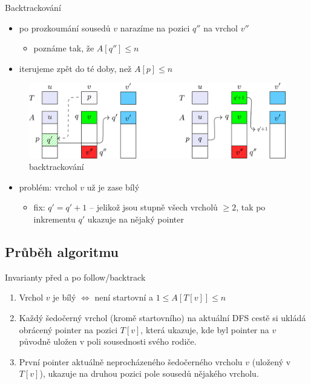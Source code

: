 \documentclass[czech]{beamer}
\begin{document}
	\begin{frame}{Backtrackování}
		\begin{itemize}
			\item po prozkoumání sousedů $v$ narazíme na pozici $q''$ na vrchol $v''$
			\begin{itemize}
				\item poznáme tak, že $A[q''] \le n$
			\end{itemize}
			\item iterujeme zpět do té doby, než $A[p] \le n$
		\end{itemize}

		\begin{figure}
			\centering
			\includegraphics{images/deg2-fix.png}
			\caption{backtrackování}
		\end{figure}
		\begin{itemize}
			\item problém: vrchol $v$ už je zase bílý
			\begin{itemize}
				\item fix: $q' = q' + 1$ -- jelikož jsou stupně všech vrcholů $\ge 2$, tak po inkrementu $q'$ ukazuje na nějaký pointer
			\end{itemize}
		\end{itemize}
	\end{frame}
		
	\subsection{Průběh algoritmu}

	\begin{frame}{Invarianty před a po follow/backtrack}
		\begin{enumerate}
				\item Vrchol $v$ je bílý $\iff$ není startovní a $1 \le A[T[v]] \le n$
				\item Každý šedočerný vrchol (kromě startovního) na aktuální DFS cestě si ukládá obrácený pointer na pozici $T[v]$, která ukazuje, kde byl pointer na $v$ původně uložen v poli sousednosti svého rodiče.
				\item První pointer aktuálně neprocházeného šedočerného vrcholu $v$ (uložený v $T[v]$), ukazuje na druhou pozici pole sousedů nějakého vrcholu.
		\end{enumerate}
	\end{frame}
\end{document}
